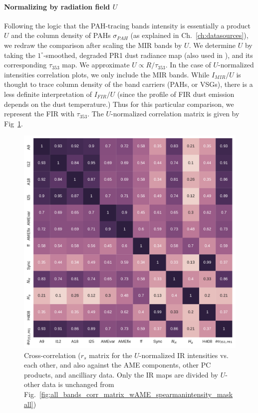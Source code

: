         \paragraph{Normalizing by radiation field $U$}
          Following the logic that the PAH-tracing bands intensity is essentially a product $U$ and the column density of PAHs $\sigma_{PAH}$ (as explained in Ch.~\ref{ch:datasources}), we redraw the comparison after scaling the MIR bands by $U$. We determine $U$ by taking the $1^{\circ}$-smoothed, degraded PR1 dust radiance map (also used in \citep{hensley16}), and its corresponding $\tau_{353}$ map. We approximate $U \propto R/\tau_{353}$. In the case of $U$-normalized intensities correlation plots, we only include the MIR bands. While $I_{MIR}/U$ is thought to trace column density of the band carriers (PAHs, or VSGs), there is a less definite interpretation of $I_{FIR}/U$ (since the profile of FIR dust emission depends on the dust temperature.) Thus for this particular comparison, we represent the FIR with $\tau_{353}$. The $U$-normalized correlation matrix is given by Fig~\ref{fig:all_bands_corr_matrix_wAME_spearmanU_norm_masked}.
                \begin{figure}
                    \includegraphics[width=\textwidth/2]{../Plots/ch_allsky/all_bands_corr_matrix_wAME_spearmanU_norm_masked.pdf}
                    \centering
                    \caption{Cross-correlation ($r_{s}$ matrix for the $U$-normalized IR intensities vs. each other, and also against the AME components, other PC products, and ancilliary data. Only the IR maps are divided by $U$- other data is unchanged from Fig.~\ref{fig:all_bands_corr_matrix_wAME_spearmanintensity_maskall})}
                    \label{fig:all_bands_corr_matrix_wAME_spearmanU_norm_masked}
                \end{figure}
